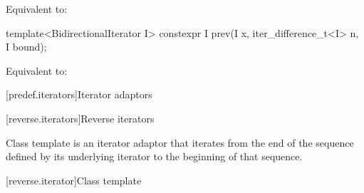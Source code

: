 \begin{addedblock}
\begin{itemdescr}
\pnum
\effects Equivalent to: 
\end{itemdescr}

%
\begin{itemdecl}
template<BidirectionalIterator I>
  constexpr I prev(I x, iter_difference_t<I> n, I bound);
\end{itemdecl}

\begin{itemdescr}
\pnum
\effects Equivalent to: 
\end{itemdescr}
\end{addedblock}

[predef.iterators]{Iterator adaptors}

[reverse.iterators]{Reverse iterators}

\pnum
Class template  is an iterator adaptor that iterates
from the end of the sequence defined by its underlying iterator to the beginning
of that sequence.

[reverse.iterator]{Class template }

